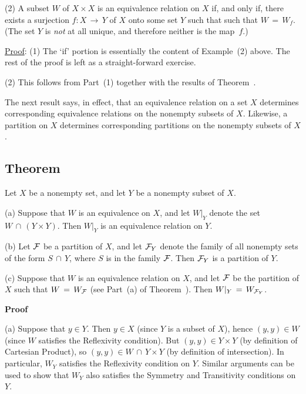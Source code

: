 \V

        (2) A subset $W$ of $X{\times}X$ is an equivalence relation on $X$ if, and only if,
    there exists a surjection $f:X \,{\rightarrow}\, Y$ of $X$ onto some set $Y$ such that such that $W \,=\, W_{f}$.
    (The set $Y$ is {\em not} at all unique, and therefore neither is the map~$f$.)

\V

        \underline{Proof}: (1) The `if' portion is essentially the content of Example~(2) above.
    The rest of the proof is left as a straight-forward exercise.

\V

        (2) This follows from Part~(1) together with the results of Theorem~.

 
      The next result says, in effect, that an equivalence relation on a set $X$ determines corresponding equivalence relations on the nonempty subsets of $X$.
    Likewise, a partition on $X$ determines corresponding partitions on the nonempty subsets of $X$.

\V

        \subsection{\small{{\bf Theorem}}}
                \label{ThmA50.115}

        Let $X$ be a nonempty set, and let $Y$ be a nonempty subset of $X$.

\V

        (a) Suppose that $W$ is an equivalence on $X$, and let $W|_{Y}$ denote the set $W\,{\cap}\,(Y{\times}Y)$.
    Then $W|_{Y}$ is an equivalence relation on $Y$.

\V

        (b) Let ${\cal F}$ be a partition of $X$, and let ${\cal F}_{Y}$ denote the family of all nonempty sets of the form $S\,{\cap}\,Y$, where $S$ is in the family ${\cal F}$.
    Then ${\cal F}_{Y}$ is a partition of $Y$.

\V

        (c) Suppose that $W$ is an equivalence relation on $X$, and let ${\cal F}$ be the partition of $X$ such that $W \,=\, W_{{\cal F}}$
    (see Part~(a) of Theorem~).
    Then $W|_{Y} \,=\, W_{{\cal F}_{Y}}$.

\V

        {\bf Proof}\, 

\V

        (a) Suppose that $y{\in}Y$.
    Then $y{\in}X$ (since $Y$ is a subset of $X$), hence $(y,y){\in}W$ (since $W$ satisfies the Reflexivity condition).
    But $(y,y){\in}Y{\times}Y$ (by definition of Cartesian Product), so $(y,y){\in}W\,{\cap}\,Y{\times}Y$ (by definition of intersection).
    In particular, $W_{Y}$ satisfies the Reflexivity condition on $Y$.
    Similar arguments can be used to show that $W_{Y}$ also satisfies the Symmetry and Transitivity conditions on $Y$.

